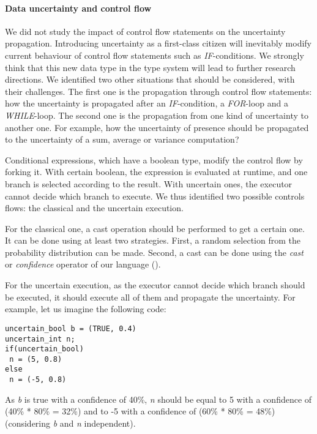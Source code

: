 \paragraph{Data uncertainty and control flow}
We did not study the impact of control flow statements on the uncertainty propagation.
Introducing uncertainty as a first-class citizen will inevitably modify current behaviour of control flow statements such as \textit{IF}-conditions.
We strongly think that this new data type in the type system will lead to further research directions.
We identified two other situations that should be considered, with their challenges.
The first one is the propagation through control flow statements: how the uncertainty is propagated after an \textit{IF}-condition, a \textit{FOR}-loop and a \textit{WHILE}-loop.
The second one is the propagation from one kind of uncertainty to another one.
For example, how the uncertainty of presence should be propagated to the uncertainty of a sum, average or variance computation?

Conditional expressions, which have a boolean type, modify the control flow by forking it.
With certain boolean, the expression is evaluated at runtime, and one branch is selected according to the result.
With uncertain ones, the executor cannot decide which branch to execute.
We thus identified two possible controls flows: the classical and the uncertain execution.

For the classical one, a cast operation should be performed to get a certain one.
It can be done using at least two strategies.
First, a random selection from the probability distribution can be made.
Second, a cast can be done using the \textit{cast} or \textit{confidence} operator of our language (\cf {}).

For the uncertain execution, as the executor cannot decide which branch should be executed, it should execute all of them and propagate the uncertainty.
For example, let us imagine the following code:

\begin{lstlisting}[style=javaStyle, caption=Example for uncertain control flow]
uncertain_bool b = (TRUE, 0.4)
uncertain_int n;
if(uncertain_bool)
 n = (5, 0.8)
else
 n = (-5, 0.8)
\end{lstlisting}
As \textit{b} is true with a confidence of 40\%, \textit{n} should be equal to 5 with a confidence of (40\% * 80\% = 32\%) and to -5 with a confidence of (60\% * 80\% = 48\%) (considering \textit{b} and \textit{n} independent).

